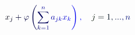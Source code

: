 \documentclass[12pt]{article}
\begin{document}
\makeatletter
\renewcommand*{\@textcolor}[3]{%
  \protect\leavevmode
  \begingroup
    \color#1{#2}#3%
  \endgroup
}
\makeatother
\begin{displaymath}
\mathcolor[RGB]{0,0,15}{x} _ { \mathcolor[RGB]{0,0,30}{j} } \mathcolor[RGB]{0,0,45}{+} \mathcolor[RGB]{0,0,60}{\varphi} \mathcolor[RGB]{0,0,75}{\left(} \mathcolor[RGB]{0,0,90}{\sum} _ { \mathcolor[RGB]{0,0,105}{k} \mathcolor[RGB]{0,0,120}{=} \mathcolor[RGB]{0,0,135}{1} } ^ { \mathcolor[RGB]{0,0,150}{n} } \mathcolor[RGB]{0,0,165}{a} _ { \mathcolor[RGB]{0,0,180}{j} \mathcolor[RGB]{0,0,195}{k} } \mathcolor[RGB]{0,0,210}{x} _ { \mathcolor[RGB]{0,0,225}{k} } \mathcolor[RGB]{0,0,240}{\right)} \mathcolor[RGB]{0,0,255}{,} \quad \mathcolor[RGB]{0,15,0}{j} \mathcolor[RGB]{0,15,15}{=} \mathcolor[RGB]{0,15,30}{1} \mathcolor[RGB]{0,15,45}{,} \mathcolor[RGB]{0,15,60}{.} \mathcolor[RGB]{0,15,75}{.} \mathcolor[RGB]{0,15,90}{.} \mathcolor[RGB]{0,15,105}{,} \mathcolor[RGB]{0,15,120}{n}
\end{displaymath}
\end{document}
